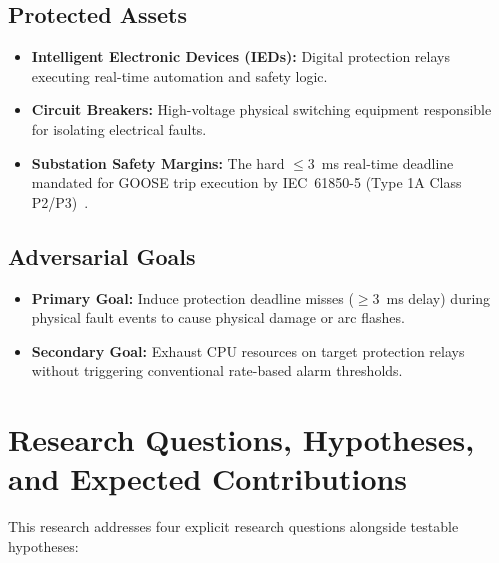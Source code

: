 \documentclass[12pt,a4paper]{article}
\begin{document}
\subsection{Protected Assets}
\begin{itemize}[noitemsep]
  \item \textbf{Intelligent Electronic Devices (IEDs):} Digital protection relays executing real-time automation and safety logic.
  \item \textbf{Circuit Breakers:} High-voltage physical switching equipment responsible for isolating electrical faults.
  \item \textbf{Substation Safety Margins:} The hard $\le 3$~ms real-time deadline mandated for GOOSE trip execution by IEC~61850-5 (Type 1A Class P2/P3)~\cite{iec61850}.
\end{itemize}

\subsection{Adversarial Goals}
\begin{itemize}[noitemsep]
  \item \textbf{Primary Goal:} Induce protection deadline misses ($\ge 3$~ms delay) during physical fault events to cause physical damage or arc flashes.
  \item \textbf{Secondary Goal:} Exhaust CPU resources on target protection relays without triggering conventional rate-based alarm thresholds.
\end{itemize}

\section{Research Questions, Hypotheses, and Expected Contributions}

This research addresses four explicit research questions alongside testable hypotheses:
\end{document}
